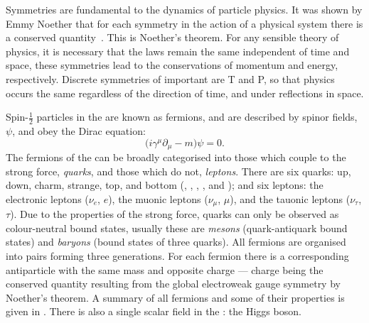 Symmetries are fundamental to the dynamics of particle physics.
It was shown by Emmy Noether that for each symmetry in the action of a physical system there is a
conserved quantity~\cite{Noether}.
This is Noether's theorem.
For any sensible theory of physics, it is necessary that the laws remain the same independent of
time and space, these symmetries lead to the conservations of momentum and energy, respectively.
Discrete symmetries of important are \gls{T} and \gls{P}, so that physics occurs the same
regardless of the direction of time, and under reflections in space.


Spin-$\tfrac12$ particles in the \sm are known as fermions, and
are described by spinor fields, $\psi$, and obey the Dirac equation:
\begin{equation}
  \big(i\gamma^\mu\partial_\mu - m\big)\psi = 0.
  \label{th:eq:dirac}
\end{equation}
The fermions of the \sm can be broadly categorised into those which couple to the strong force,
\emph{quarks}, and those which do not, \emph{leptons}.
There are six quarks: up, down, charm, strange, top, and bottom (\uquark, \dquark, \cquark,
\squark, \tquark and \bquark); and six leptons:
the electronic leptons ($\nu_e$, $e$),
the muonic leptons ($\nu_\mu$, $\mu$),
and the tauonic leptons ($\nu_\tau$, $\tau$).
Due to the properties of the strong force, quarks can only be observed as colour-neutral bound
states, usually these are
\emph{mesons} (quark-antiquark bound states) and \emph{baryons} (bound states of three quarks).
All fermions are organised into pairs forming three generations.
For each fermion there is a corresponding antiparticle with the same mass and opposite charge ---
charge being the conserved quantity resulting from the global electroweak gauge symmetry by
Noether's theorem.
A summary of all fermions and some of their properties is given in .
There is also a single scalar field in the \sm: the Higgs boson.

